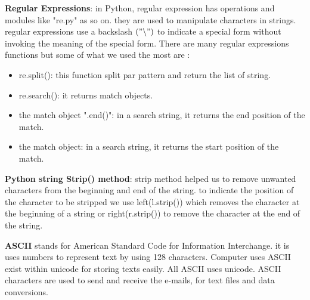 \begin{itemize}
\textbf{Regular Expressions}: in Python, regular expression has operations and modules like "re.py" as so on. they are used to manipulate characters in strings. regular expressions use a backslash $(" \backslash  ")$  to indicate a special form without invoking the meaning of the special form. There are many regular expressions functions but some of what we used the most are :
\begin{itemize}
\item re.split(): this function split par pattern and return the list of string.
\item re.search(): it returns match objects.
\item the match object ".end()": in a search string, it returns the end position of the match.
\item the match object: in a search string, it returns the start position of the match.
\end{itemize}

\textbf{Python string Strip() method}: strip method helped us to remove unwanted characters from the beginning and end of the string. to indicate the position of the character to be stripped we use left(l.strip()) which removes the character at the beginning of a string or right(r.strip()) to remove the character at the end of the string.

\textbf{ASCII} stands for American Standard Code for Information Interchange. it is uses numbers to represent text by using 128 characters. Computer uses ASCII exist within unicode for storing texts easily. All  ASCII uses unicode. ASCII characters are used to send and receive the e-mails, for text files and data conversions. 



\end{itemize}
